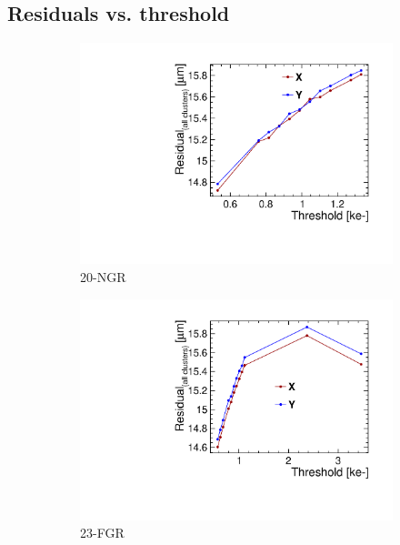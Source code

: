\subsection{Residuals vs. threshold}
\begin{figure}[htbp] \centering
  \begin{subfigure}[b]{0.33\textwidth}
    \includegraphics[width=\textwidth]{./figures/TestBeam/residuals_W0019_G07_THLscan.pdf}
    \caption{20-NGR}
  \end{subfigure} \hfill
  \begin{subfigure}[b]{0.33\textwidth}
    \includegraphics[width=\textwidth]{./figures/TestBeam/residuals_W0019_F07_THLscan.pdf}
    \caption{23-FGR}
  \end{subfigure}\hfill
  \begin{subfigure}[b]{0.33\textwidth}

\end{subfigure}
\end{figure}
